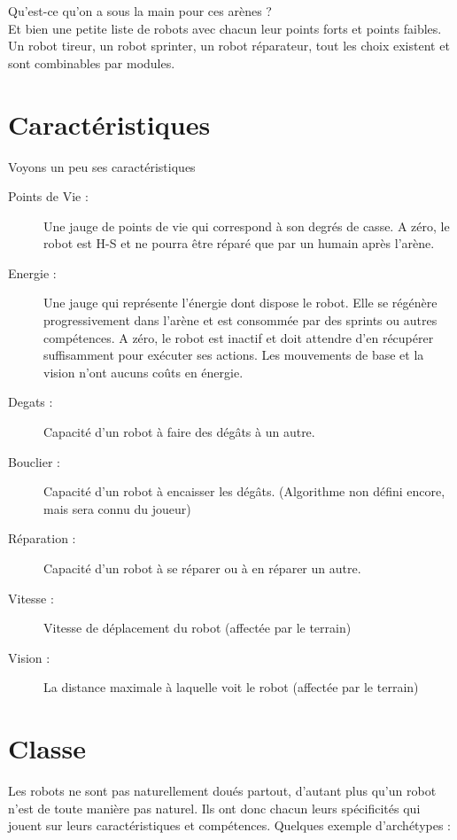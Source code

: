 \documentclass[10pt]{article}
\begin{document}
Qu'est-ce qu'on a sous la main pour ces arènes ?\\
Et bien une petite liste de robots avec chacun leur points forts et points faibles. Un robot tireur, un robot sprinter, un robot réparateur, tout les choix existent et sont combinables par modules.

\section{Caractéristiques}

Voyons un peu ses caractéristiques
\begin{description}
\item[Points de Vie :] Une jauge de points de vie qui correspond à son degrés de casse. A zéro, le robot est H-S et ne pourra être réparé que par un humain après l'arène.
\item[Energie :] Une jauge qui représente l'énergie dont dispose le robot. Elle se régénère progressivement dans l'arène et est consommée par des sprints ou autres compétences. A zéro, le robot est inactif et doit attendre d'en récupérer suffisamment pour exécuter ses actions. Les mouvements de base et la vision n'ont aucuns coûts en énergie.
\item[Degats :] Capacité d'un robot à faire des dégâts à un autre.
\item[Bouclier :] Capacité d'un robot à encaisser les dégâts. (Algorithme non défini encore, mais sera connu du joueur)
\item[Réparation :] Capacité d'un robot à se réparer ou à en réparer un autre.
\item[Vitesse :] Vitesse de déplacement du robot (affectée par le terrain)
\item[Vision :] La distance maximale à laquelle voit le robot (affectée par le terrain)
\end{description}

\section{Classe}

Les robots ne sont pas naturellement doués partout, d'autant plus qu'un robot n'est de toute manière pas naturel. Ils ont donc chacun leurs spécificités qui jouent sur leurs caractéristiques et compétences.
Quelques exemple d'archétypes : 


\end{document}
